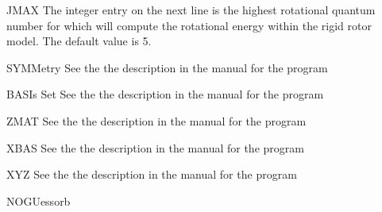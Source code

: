 \begin{keywordlist}
\item[JMAX]
The integer entry on the next line is the highest rotational quantum
number for which
 will compute the rotational energy within the
rigid rotor model. The default value is 5.
\item[SYMMetry]
See the the description in the manual for the program 
\item[BASIs Set]
See the the description in the manual for the program 
\item[ZMAT]
See the the description in the manual for the program 
\item[XBAS]
See the the description in the manual for the program 
\item[XYZ]
See the the description in the manual for the program 
\item[NOGUessorb]

\end{keywordlist}
